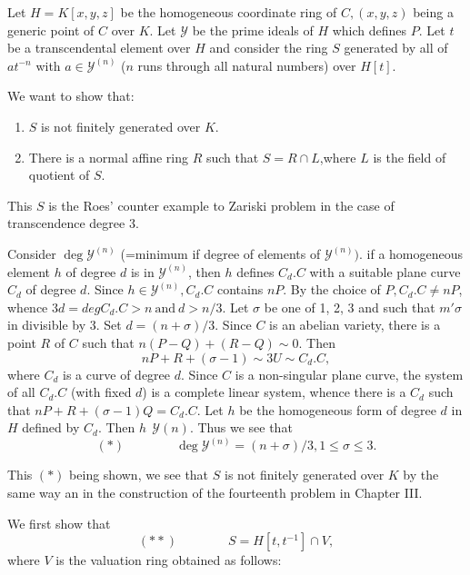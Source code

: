  Let $H=K [x,y,z]$ be the homogeneous coordinate ring of $C,(x,y,z)$
 being a generic point of $C$ over $K$. Let $\mathscr{Y}$ be the prime
 ideals of $H$ which defines $P$. Let $t$ be a transcendental element
 over $H$ and consider the ring $S$ generated by all of $at^{-n}$ with
 $a \in \mathscr{Y}^{(n)}$ ($n$ runs through all natural numbers) over
 $H[t]$. 
     
 We want to show that:
 \begin{enumerate}[(1)]
 \item $S$ is not finitely generated over $K$.

 \item There is a normal affine ring $R$ such that $S=R \cap L$,where
   $L$ is the field of quotient of $S$. 
 \end{enumerate}      

 This $S$ is the Roes' counter example to Zariski problem in the case
 of transcendence degree 3. 
     


\medskip
{} Consider $\deg \mathscr{Y}^{(n)}$
(=minimum if degree 
 of elements of $\mathscr{Y}^{(n)})$. if a homogeneous element $h$ of
 degree $d$ is in $\mathscr{Y}^{(n)}$, then $h$ defines $C_d.C$ with a
 suitable plane curve $C_d$ of degree $d$. Since $h \in
 \mathscr{Y}^{(n)}, C_d.C$ contains $nP$. By the choice of $P, C_d.C
 \neq nP$, whence $3d=deg C_d. C >n ~\text{and}~d > n/3$. Let $\sigma$ be one
 of 1, 2, 3 \pageoriginale and such that $m' \sigma$ in divisible by
3. Set $d = (n + \sigma)/3$. Since $C$ is an abelian variety, there is
a point $R$ of $C$ such that $ n(P-Q) + (R-Q) \sim 0$.  Then  
 $$
 nP + R+ (\sigma-1) \sim 3 U \sim C_d. C, 
 $$
where $C_d$ is a curve of degree $d$.  Since $C$ is a non-singular
plane curve, the system of all $C_d.C$ (with fixed $d$) is a complete
linear system,  whence there is a $C_d$ such that $nP+R+(\sigma-1) Q
=C_d. C.$  Let $h$ be the homogeneous form of degree $d$ in $H$ defined
by $C_d$.  Then $h~~ \mathscr{Y}(n)$. Thus we see that  
$$
(\ast) \qquad \qquad  \deg \mathscr{Y}^{(n)}= (n+\sigma) /3, 1\leq
\sigma \leq 3. 
$$

This $(\ast)$ being shown, we see that $S$ is not finitely generated
over $K$ by the same way an in the construction of the fourteenth
problem in Chapter III. 

\medskip
{}  We first show that
$$
(\ast \ast) \qquad \qquad S = H [t,t^{-1}] \cap V,
$$
where $V$ is the valuation ring obtained as follows:


